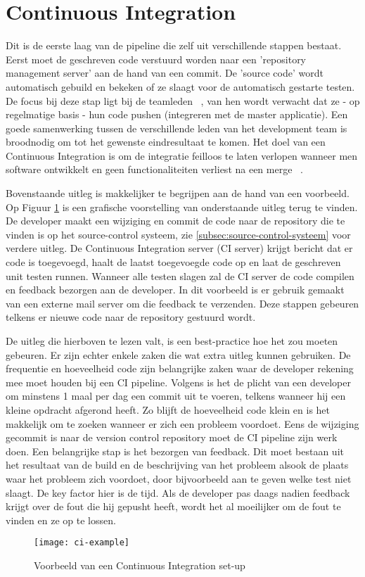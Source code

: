         \section{Continuous Integration}
        Dit is de eerste laag van de pipeline die zelf uit verschillende stappen bestaat. Eerst moet de geschreven code verstuurd worden naar een 'repository management server' aan de hand van een commit. De 'source code' wordt automatisch gebuild en bekeken of ze slaagt voor de automatisch gestarte testen. De focus bij deze stap ligt bij de teamleden ~\autocite{Fowler2006}, van hen wordt verwacht dat ze - op regelmatige basis - hun code pushen (integreren met de master applicatie). Een goede samenwerking tussen de verschillende leden van het development team is broodnodig om tot het gewenste eindresultaat te komen.
        Het doel van een Continuous Integration is om de integratie feilloos te laten verlopen wanneer men software ontwikkelt en geen functionaliteiten verliest na een merge ~\autocite{Riti2018}.
        
        Bovenstaande uitleg is makkelijker te begrijpen aan de hand van een voorbeeld. Op Figuur \ref{img-ci-example} is een grafische voorstelling van onderstaande uitleg terug te vinden.
        De developer maakt een wijziging en commit de code naar de repository die te vinden is op het source-control systeem, zie \ref{subsec:source-control-systeem} voor verdere uitleg. De Continuous Integration server (CI server) krijgt bericht dat er code is toegevoegd, haalt de laatst toegevoegde code op en laat de geschreven unit testen runnen. Wanneer alle testen slagen zal de CI server de code compilen en feedback bezorgen aan de developer. In dit voorbeeld is er gebruik gemaakt van een externe mail server om die feedback te verzenden.
        Deze stappen gebeuren telkens er nieuwe code naar de repository gestuurd wordt.
        
        De uitleg die hierboven te lezen valt, is een best-practice hoe het zou moeten gebeuren. Er zijn echter enkele zaken die wat extra uitleg kunnen gebruiken.
        De frequentie en hoeveelheid code zijn belangrijke zaken waar de developer rekening mee moet houden bij een CI pipeline. Volgens \textcite{Fowler2006} is het de plicht van een developer om minstens 1 maal per dag een commit uit te voeren, telkens wanneer hij een kleine opdracht afgerond heeft. Zo blijft de hoeveelheid code klein en is het makkelijk om te zoeken wanneer er zich een probleem voordoet.
        Eens de wijziging gecommit is naar de version control repository moet de CI pipeline zijn werk doen. Een belangrijke stap is het bezorgen van feedback. Dit moet bestaan uit het resultaat van de build en de beschrijving van het probleem alsook de plaats waar het probleem zich voordoet, door bijvoorbeeld aan te geven welke test niet slaagt. De key factor hier is de tijd. Als de developer pas daags nadien feedback krijgt over de fout die hij gepusht heeft, wordt het al moeilijker om de fout te vinden en ze op te lossen. 
        \begin{figure}	
            \texttt{[image: ci-example]}
            \caption{Voorbeeld van een Continuous Integration set-up ~\autocite{Riti2018}} \label{img-ci-example}
        \end{figure}
    

